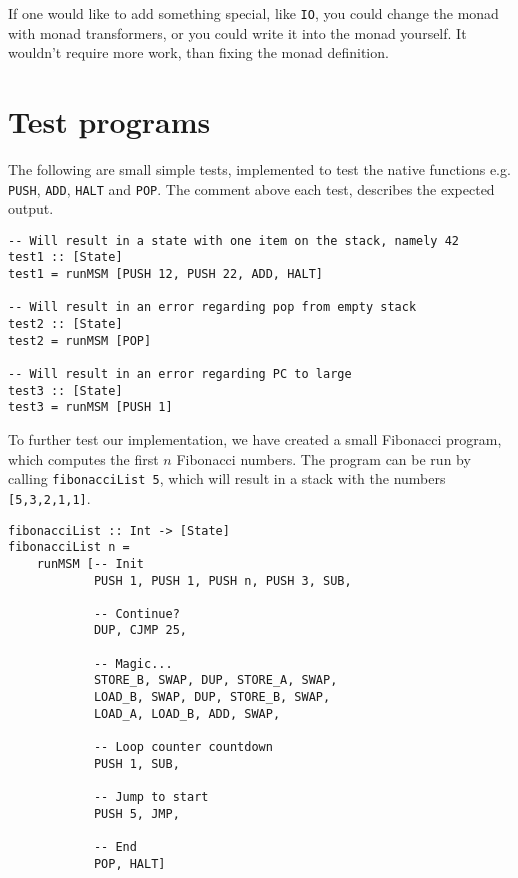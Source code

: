 \documentclass[10pt, a4paper]{article}
\begin{document}
If one would like to add something special, like \texttt{IO}, you could change the monad with monad transformers, or you could write it into the monad yourself.
It wouldn't require more work, than fixing the monad definition.

\section{Test programs}

The following are small simple tests, implemented to test the native functions e.g. \texttt{PUSH}, \texttt{ADD}, \texttt{HALT} and \texttt{POP}. The comment above each test, describes the expected output.
\begin{lstlisting}
-- Will result in a state with one item on the stack, namely 42
test1 :: [State]
test1 = runMSM [PUSH 12, PUSH 22, ADD, HALT]

-- Will result in an error regarding pop from empty stack
test2 :: [State]
test2 = runMSM [POP]

-- Will result in an error regarding PC to large
test3 :: [State]
test3 = runMSM [PUSH 1]
\end{lstlisting}

To further test our implementation, we have created a small Fibonacci program, which computes the first $n$ Fibonacci numbers. The program can be run by calling \texttt{fibonacciList 5}, which will result in a stack with the numbers \texttt{[5,3,2,1,1]}.

\begin{lstlisting}
fibonacciList :: Int -> [State]
fibonacciList n = 
    runMSM [-- Init
            PUSH 1, PUSH 1, PUSH n, PUSH 3, SUB,
            
            -- Continue?
            DUP, CJMP 25,
            
            -- Magic...
            STORE_B, SWAP, DUP, STORE_A, SWAP,
            LOAD_B, SWAP, DUP, STORE_B, SWAP,
            LOAD_A, LOAD_B, ADD, SWAP,
            
            -- Loop counter countdown
            PUSH 1, SUB,
            
            -- Jump to start
            PUSH 5, JMP,
            
            -- End
            POP, HALT]
\end{lstlisting}
\end{document}
